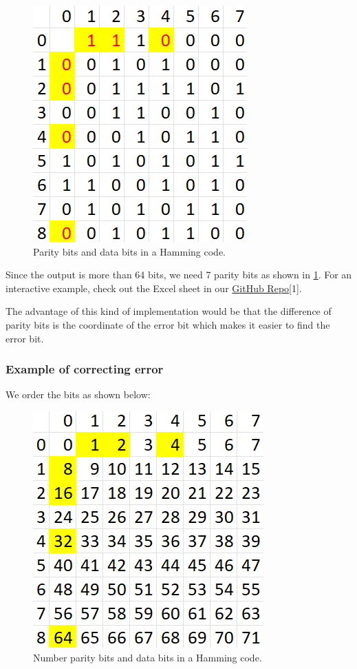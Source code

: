 \documentclass[conference]{IEEEtran}
\begin{document}
\begin{figure}[htbp]
  \centerline{\includegraphics{Images/Hamming_example.png}}
  \caption{Parity bits and data bits in a Hamming code.}
  \label{fig_2}
\end{figure}

Since the output is more than 64 bits, we need 7 parity bits as shown in
\ref{fig_2}. For an interactive example, check out the Excel sheet in our
\href{https://github.com/luckunately/ELEC433-Projects}{GitHub Repo}[1]. %

The advantage of this kind of implementation would be that the difference of
parity bits is the coordinate of the error bit which makes it easier to find
the error bit.

\subsubsection{Example of correcting error}

We order the bits as shown below:

\begin{figure}[htbp]
  \centerline{\includegraphics{Images/Hamming_bits_order.png}}
  \caption{Number parity bits and data bits in a Hamming code.}
  \label{fig_3}
\end{figure}
\end{document}
